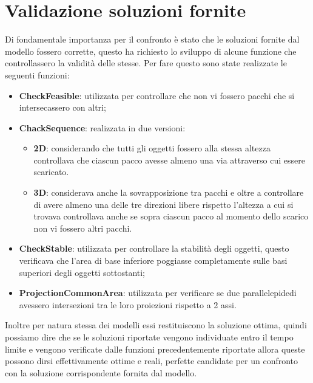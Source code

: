 \section{Validazione soluzioni fornite}
Di fondamentale importanza per il confronto è stato che le soluzioni fornite dal modello fossero corrette, questo ha richiesto lo sviluppo di alcune funzione che controllassero la validità delle stesse. Per fare questo sono state realizzate le seguenti funzioni:
\begin{itemize}
	\item \textbf{CheckFeasible}: utilizzata per controllare che non vi fossero pacchi che si intersecassero con altri;
	\item \textbf{ChackSequence}: realizzata in due versioni:
	      \begin{itemize}
	      	\item \textbf{2D}: considerando che tutti gli oggetti fossero alla stessa altezza controllava che ciascun pacco avesse almeno una via attraverso cui essere scaricato.
	      	\item \textbf{3D}: considerava anche la sovrapposizione tra pacchi e oltre a controllare di avere almeno una delle tre direzioni libere rispetto l'altezza a cui si trovava controllava anche se sopra ciascun pacco al momento dello scarico non vi fossero altri pacchi.
	      \end{itemize}
	\item \textbf{CheckStable}: utilizzata per controllare la stabilità degli oggetti, questo verificava che l'area di base inferiore poggiasse completamente sulle basi superiori degli oggetti sottostanti;
	\item \textbf{ProjectionCommonArea}: utilizzata per verificare se due parallelepidedi avessero intersezioni tra le loro proiezioni rispetto a 2 assi.
\end{itemize}

Inoltre per natura stessa dei modelli essi restituiscono la soluzione ottima, quindi possiamo dire che se le soluzioni riportate vengono individuate entro il tempo limite e vengono verificate dalle funzioni precedentemente riportate allora queste possono dirsi effettivamente ottime e reali, perfette candidate per un confronto con la soluzione corrispondente fornita dal modello.